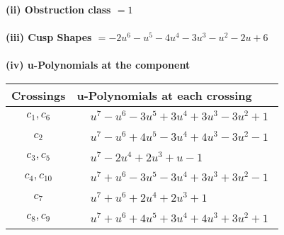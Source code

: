 \documentclass[1p]{elsarticle_modified}
\theoremstyle{definition}
\begin{document}
\flushleft \textbf{(ii) Obstruction class $= 1$}\\~\\
\flushleft \textbf{(iii) Cusp Shapes $= -2 u^6- u^5-4 u^4-3 u^3- u^2-2 u+6$}\\~\\
\newpage\renewcommand{\arraystretch}{1}
\flushleft \textbf{(iv) u-Polynomials at the component}\newline \\
\begin{tabular}{m{50pt}|m{274pt}}
Crossings & \hspace{64pt}u-Polynomials at each crossing \\
\hline $$\begin{aligned}c_{1},c_{6}\end{aligned}$$&$\begin{aligned}
&u^7- u^6-3 u^5+3 u^4+3 u^3-3 u^2+1
\end{aligned}$\\
\hline $$\begin{aligned}c_{2}\end{aligned}$$&$\begin{aligned}
&u^7- u^6+4 u^5-3 u^4+4 u^3-3 u^2-1
\end{aligned}$\\
\hline $$\begin{aligned}c_{3},c_{5}\end{aligned}$$&$\begin{aligned}
&u^7-2 u^4+2 u^3+u-1
\end{aligned}$\\
\hline $$\begin{aligned}c_{4},c_{10}\end{aligned}$$&$\begin{aligned}
&u^7+u^6-3 u^5-3 u^4+3 u^3+3 u^2-1
\end{aligned}$\\
\hline $$\begin{aligned}c_{7}\end{aligned}$$&$\begin{aligned}
&u^7+u^6+2 u^4+2 u^3+1
\end{aligned}$\\
\hline $$\begin{aligned}c_{8},c_{9}\end{aligned}$$&$\begin{aligned}
&u^7+u^6+4 u^5+3 u^4+4 u^3+3 u^2+1
\end{aligned}$\\
\hline
\end{tabular}\\~\\
\end{document}
